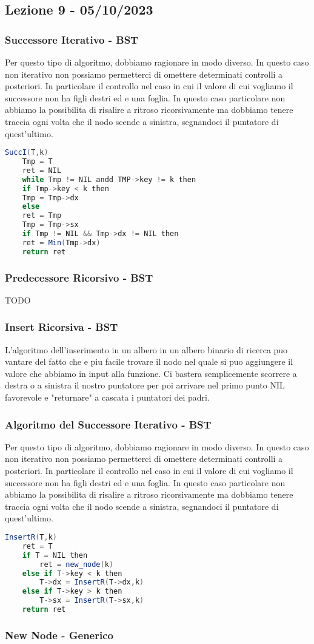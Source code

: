 \subsection{Lezione 9 - 05/10/2023}

\subsubsection{Successore Iterativo - BST}

Per questo tipo di algoritmo, dobbiamo ragionare in modo diverso. In questo caso non iterativo non possiamo permetterci di omettere determinati controlli a posteriori. In particolare il controllo nel caso in cui il valore di cui vogliamo il successore non ha figli destri ed e una foglia. In questo caso particolare non abbiamo la possibilita di risalire a ritroso ricorsivamente ma dobbiamo tenere traccia ogni volta che il nodo scende a sinistra, segnandoci il puntatore di quest'ultimo.

\begin{lstlisting}[language=Java]
	SuccI(T,k)
	Tmp = T
	ret = NIL
	while Tmp != NIL andd TMP->key != k then
	if Tmp->key < k then
	Tmp = Tmp->dx
	else 
	ret = Tmp
	Tmp = Tmp->sx
	if Tmp != NIL && Tmp->dx != NIL then
	ret = Min(Tmp->dx)
	return ret
\end{lstlisting}

\subsubsection{Predecessore Ricorsivo - BST}
TODO

\subsubsection{Insert Ricorsiva - BST}

L'algoritmo dell'inserimento in un albero in un albero binario di ricerca puo vantare del fatto che e piu facile trovare il nodo nel quale si puo aggiungere il valore che abbiamo in input alla funzione. Ci bastera semplicemente scorrere a destra o a sinistra il nostro puntatore per poi arrivare nel primo punto NIL favorevole e "returnare" a cascata i puntatori dei padri.

\subsubsection{Algoritmo del Successore Iterativo - BST}

Per questo tipo di algoritmo, dobbiamo ragionare in modo diverso. In questo caso non iterativo non possiamo permetterci di omettere determinati controlli a posteriori. In particolare il controllo nel caso in cui il valore di cui vogliamo il successore non ha figli destri ed e una foglia. In questo caso particolare non abbiamo la possibilita di risalire a ritroso ricorsivamente ma dobbiamo tenere traccia ogni volta che il nodo scende a sinistra, segnandoci il puntatore di quest'ultimo.

\begin{lstlisting}[language=Java]
	InsertR(T,k)
	ret = T
	if T = NIL then
		ret = new_node(k)
	else if T->key < k then
		T->dx = InsertR(T->dx,k)
	else if T->key > k then
		T->sx = InsertR(T->sx,k)
	return ret
\end{lstlisting}

\subsubsection{New Node - Generico}

